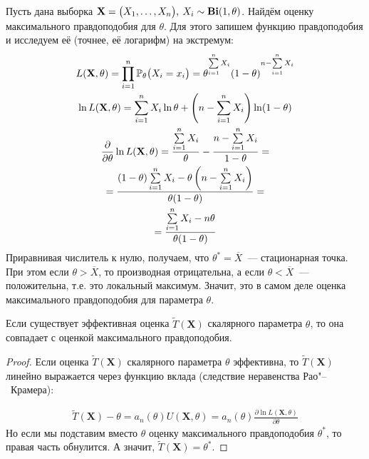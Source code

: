 \begin{exmp}
    Пусть дана выборка $\mathbf{X} = \bigl( X_1, \ldots, X_n \bigr), \: X_i \sim \mathbf{Bi}(1, \theta)$.
    Найдём оценку максимального правдоподобия для $\theta$.
    Для этого запишем функцию правдоподобия и исследуем её (точнее, её логарифм) на экстремум:
    \begin{gather*}
        L(\mathbf{X}, \theta) = \prod\limits_{i = 1}^{n} \mathbb{P}_{\theta}\bigl(X_i = x_i\bigr)= \theta^{\sum\limits_{i=1}^{n} X_i} (1 - \theta)^{n - \sum\limits_{i=1}^{n} X_i} \\
        \ln L(\mathbf{X}, \theta) = \sum\limits_{i=1}^{n} X_i \ln \theta + \left(n - \sum\limits_{i=1}^{n} X_i\right) \ln(1 - \theta) \\
        \frac{\partial}{\partial \theta} \ln L(\mathbf{X}, \theta) = \frac{\sum\limits_{i=1}^{n} X_i}{\theta} - \frac{n - \sum\limits_{i=1}^{n} X_i}{1 - \theta} = \\
        = \frac{(1 - \theta)\sum\limits_{i=1}^{n} X_i - \theta\left(n - \sum\limits_{i=1}^{n} X_i\right)}{\theta (1 - \theta)} = \\
        = \frac{\sum\limits_{i=1}^{n} X_i - n\theta}{\theta(1 - \theta)}
    \end{gather*}
    Приравнивая числитель к нулю, получаем, что $\theta^{*} = \overline{X}$~--- стационарная точка.
    При этом если $\theta > \overline{X}$, то производная отрицательна, а если $\theta < \overline{X}$~--- положительна, т.е. это локальный максимум.
    Значит, это в самом деле оценка максимального правдоподобия для параметра $\theta$.
\end{exmp}

\begin{thm*}
    Если существует эффективная оценка $\widetilde{T}(\mathbf{X})$ скалярного параметра $\theta$, то она совпадает с оценкой максимального правдоподобия.
\end{thm*}

\begin{proof}
    Если оценка $\widetilde{T}(\mathbf{X})$ скалярного параметра $\theta$ эффективна, то $\widetilde{T}(\mathbf{X})$ линейно выражается через функцию вклада (следствие неравенства Рао"--~Крамера):

    \begin{gather*}
        \widetilde{T}(\mathbf{X}) - \theta = a_n(\theta) U(\mathbf{X}, \theta) = a_n(\theta) \frac{\partial \ln L(\mathbf{X}, \theta)}{\partial \theta}
    \end{gather*}
    Но если мы подставим вместо $\theta$ оценку максимального правдоподобия $\theta^{*}$, то правая часть обнулится.
    А значит, $\widetilde{T}(\mathbf{X}) = \theta^{*}$.
\end{proof}

